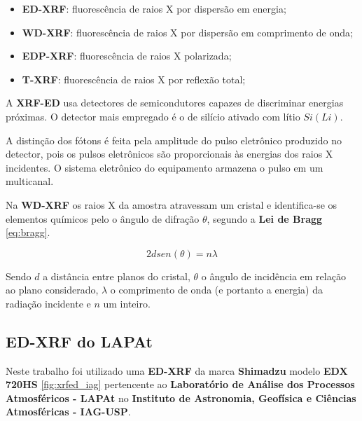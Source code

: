 \begin{itemize}
  \item \textbf{ED-XRF}: fluorescência de raios X por dispersão em energia;
  \item \textbf{WD-XRF}: fluorescência de raios X por dispersão em comprimento de onda;
  \item \textbf{EDP-XRF}: fluorescência de raios X polarizada;
  \item \textbf{T-XRF}: fluorescência de raios X por reflexão total;
\end{itemize}


A \textbf{XRF-ED} usa detectores de semicondutores capazes de
discriminar energias próximas. 
O detector mais empregado é o de silício ativado com lítio $Si(Li)$. 

A distinção dos fótons é feita pela amplitude do pulso 
eletrônico produzido no detector, pois os pulsos eletrônicos são
proporcionais às energias dos raios X incidentes. O sistema eletrônico do 
equipamento armazena o pulso em um multicanal.


Na \textbf{WD-XRF} os raios X da amostra atravessam um cristal 
e identifica-se os elementos químicos pelo o ângulo de difração $\theta$, segundo 
a \textbf{Lei de Bragg} \ref{eq:bragg}. 

\begin{equation}
  \label{eq:bragg}
  2d sen(\theta) = n \lambda
\end{equation}

Sendo $d$ a distância entre planos do cristal, $\theta$ o ângulo de incidência em 
relação ao plano considerado, $\lambda$ o comprimento de onda (e portanto a energia) 
da radiação incidente e $n$ um inteiro. 

\subsection{\textbf{ED-XRF} do \textbf{LAPAt}}

Neste trabalho foi utilizado uma \textbf{ED-XRF} da marca \textbf{Shimadzu} 
modelo \textbf{EDX 720HS} \ref{fig:xrfed_iag} pertencente ao 
\textbf{Laboratório de Análise dos Processos Atmosféricos - LAPAt}
no \textbf{Instituto de Astronomia, Geofísica e Ciências Atmosféricas - IAG-USP}.

